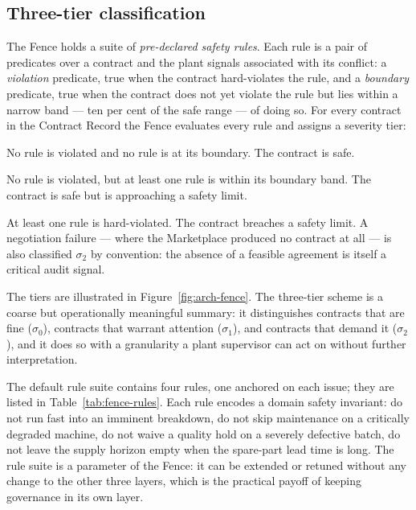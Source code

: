 \subsection{Three-tier classification}
\label{subsec:fence-tiers}

The Fence holds a suite of \emph{pre-declared safety rules}. Each rule
is a pair of predicates over a contract and the plant signals
associated with its conflict: a \emph{violation} predicate, true when
the contract hard-violates the rule, and a \emph{boundary} predicate,
true when the contract does not yet violate the rule but lies within a
narrow band --- ten per cent of the safe range --- of doing so. For
every contract in the Contract Record the Fence evaluates every rule
and assigns a severity tier:

\begin{description}[leftmargin=2.6em,style=nextline,itemsep=0.25em]
  \item[$\sigma_0$ --- Normal.] No rule is violated and no rule is at
    its boundary. The contract is safe.
  \item[$\sigma_1$ --- Warning.] No rule is violated, but at least one
    rule is within its boundary band. The contract is safe but is
    approaching a safety limit.
  \item[$\sigma_2$ --- Critical.] At least one rule is hard-violated.
    The contract breaches a safety limit. A negotiation failure ---
    where the Marketplace produced no contract at all --- is also
    classified $\sigma_2$ by convention: the absence of a feasible
    agreement is itself a critical audit signal.
\end{description}

The tiers are illustrated in Figure~\ref{fig:arch-fence}. The
three-tier scheme is a coarse but operationally meaningful summary: it
distinguishes contracts that are fine ($\sigma_0$), contracts that
warrant attention ($\sigma_1$), and contracts that demand it
($\sigma_2$), and it does so with a granularity a plant supervisor can
act on without further interpretation.


The default rule suite contains four rules, one anchored on each issue;
they are listed in Table~\ref{tab:fence-rules}. Each rule encodes a
domain safety invariant: do not run fast into an imminent breakdown, do
not skip maintenance on a critically degraded machine, do not waive a
quality hold on a severely defective batch, do not leave the supply
horizon empty when the spare-part lead time is long. The rule suite is
a parameter of the Fence: it can be extended or retuned without any
change to the other three layers, which is the practical payoff of
keeping governance in its own layer.

